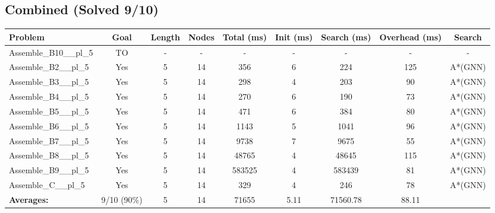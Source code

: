 \documentclass{article}
\begin{document}
\subsection*{Combined (Solved 9/10)}
\begin{tabular}{lcccccccc}
\toprule
Problem & Goal & Length & Nodes & Total (ms) & Init (ms) & Search (ms) & Overhead (ms) & Search \\
\midrule
Assemble\_B10\_\_pl\_5 & TO & - & - & - & - & - & - & - \\
Assemble\_B2\_\_pl\_5 & Yes & 5 & 14 & 356 & 6 & 224 & 125 & A*(GNN) \\
Assemble\_B3\_\_pl\_5 & Yes & 5 & 14 & 298 & 4 & 203 & 90 & A*(GNN) \\
Assemble\_B4\_\_pl\_5 & Yes & 5 & 14 & 270 & 6 & 190 & 73 & A*(GNN) \\
Assemble\_B5\_\_pl\_5 & Yes & 5 & 14 & 471 & 6 & 384 & 80 & A*(GNN) \\
Assemble\_B6\_\_pl\_5 & Yes & 5 & 14 & 1143 & 5 & 1041 & 96 & A*(GNN) \\
Assemble\_B7\_\_pl\_5 & Yes & 5 & 14 & 9738 & 7 & 9675 & 55 & A*(GNN) \\
Assemble\_B8\_\_pl\_5 & Yes & 5 & 14 & 48765 & 4 & 48645 & 115 & A*(GNN) \\
Assemble\_B9\_\_pl\_5 & Yes & 5 & 14 & 583525 & 4 & 583439 & 81 & A*(GNN) \\
Assemble\_C\_\_pl\_5 & Yes & 5 & 14 & 329 & 4 & 246 & 78 & A*(GNN) \\
\textbf{Averages:} & 9/10 (90\%) & 5 & 14 & 71655 & 5.11 & 71560.78 & 88.11 & \\
\bottomrule
\end{tabular}
\\[0.7cm]
\end{document}
